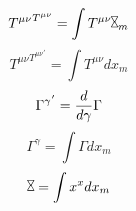 \documentclass{jsarticle}
\begin{document}
\title{}
\author{}
\date{}
\maketitle
\newcommand{\timebow}{%
	\begin{picture}(0.0)
		\put(0.0){
			\rotatebox{90}{$\bowtie$}}
	\end{picture}} 

   $$ {T^{\mu\nu}}^{T^{\mu\nu}} = \int T^{\mu\nu} \rotatebox{90}{$\bowtie$}_m $$
   $$   {T^{\mu\nu}}^{{T^{\mu\nu}}^{'}}=\int T^{\mu\nu}dx_m  $$
      $$ {\Gamma^{\gamma}}^{'} = {d \over {d \gamma}}\Gamma $$
   $$ \Gamma^{\gamma} = \int \Gamma dx_m $$
   $$ \rotatebox{90}{$\bowtie$} = \int x^x dx_m $$
\end{document}
